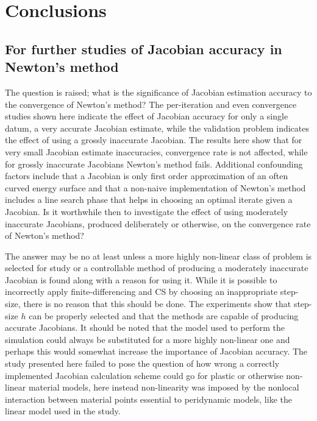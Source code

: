 \documentclass[preprint,12pt]{elsarticle}
\begin{document}
\section{Conclusions}
%
\subsection{For further studies of Jacobian accuracy in Newton's method}
\label{subsec:FurtherStudies}
The question is raised; what is the significance of Jacobian estimation
accuracy to the convergence of Newton's method?  The per-iteration and even
convergence studies shown here indicate the effect of Jacobian accuracy for
only a single datum, a very accurate Jacobian estimate, while the validation
problem indicates the effect of using a grossly inaccurate Jacobian. The results here show that
for very small Jacobian estimate inaccuracies, convergence rate is not
affected, while for grossly inaccurate Jacobians Newton's method fails. 
Additional confounding factors include that a Jacobian is only first
order approximation of an often curved energy surface and that a non-naive implementation of Newton's
method includes a line search phase that helps in choosing an optimal iterate given a Jacobian.
Is it worthwhile then to investigate the effect of using moderately inaccurate Jacobians, 
produced deliberately or otherwise, on the convergence rate of Newton's method?

The answer may be no at least unless a more highly non-linear class of problem
is selected for study or a controllable method of producing a moderately
inaccurate Jacobian is found along with a reason for using it. While it is possible
to incorrectly apply finite-differencing and CS by choosing an inappropriate
step-size, there is no reason that this should be done. The experiments show
that step-size $h$ can be properly selected and that the methods are capable of
producing accurate Jacobians. It should be noted that the model used to perform
the simulation could always be substituted for a more highly non-linear one and
perhaps this would somewhat increase the importance of Jacobian accuracy. The
study presented here failed to pose the question of how wrong a correctly
implemented Jacobian calculation scheme could go for plastic or otherwise
non-linear material models, here instead non-linearity was imposed by the
nonlocal interaction between material points essential to peridynamic models,
like the linear model used in the study. 
\end{document}
